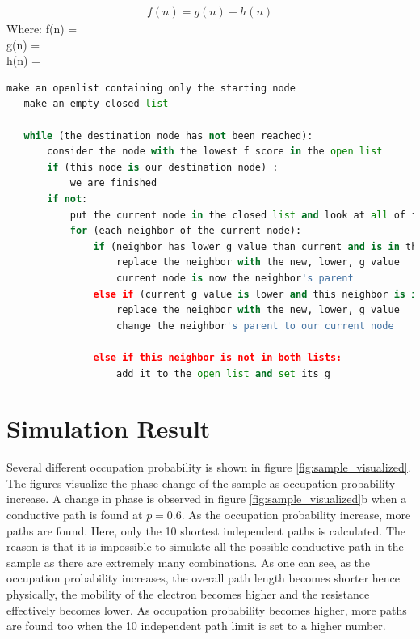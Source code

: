 \documentclass[11pt,a4paper]{report}
\begin{document}
\begin{align}\label{eq:a*}
    f(n) = g(n) + h(n)
\end{align}
Where:
f(n) = \\
g(n) = \\
h(n) = 


\begin{lstlisting}[language=Python]
   make an openlist containing only the starting node
   make an empty closed list

   while (the destination node has not been reached):
       consider the node with the lowest f score in the open list
       if (this node is our destination node) :
           we are finished 
       if not:
           put the current node in the closed list and look at all of its neighbors
           for (each neighbor of the current node):
               if (neighbor has lower g value than current and is in the closed list) :
                   replace the neighbor with the new, lower, g value 
                   current node is now the neighbor's parent            
               else if (current g value is lower and this neighbor is in the open list ) :
                   replace the neighbor with the new, lower, g value 
                   change the neighbor's parent to our current node

               else if this neighbor is not in both lists:
                   add it to the open list and set its g
\end{lstlisting}

\section{Simulation Result}\label{section:simulation_result}
Several different occupation probability is shown in figure \ref{fig:sample_visualized}. The figures visualize the phase change of the sample as occupation probability increase. A change in phase is observed in figure \ref{fig:sample_visualized}b when a conductive path is found at $p=0.6$. As the occupation probability increase, more paths are found. Here, only the 10 shortest independent paths is calculated. The reason is that it is impossible to simulate all the possible conductive path in the sample as there are extremely many combinations. As one can see, as the occupation probability increases, the overall path length becomes shorter hence physically, the mobility of the electron becomes higher and the resistance effectively becomes lower. As occupation probability becomes higher, more paths are found too when the 10 independent path limit is set to a higher number.
\end{document}
